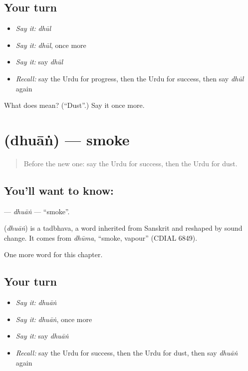 \subsection*{Your turn}
\begin{itemize}
\raggedright
  \item \emph{Say it:} \emph{dhūl}
  \item \emph{Say it:} \emph{dhūl}, once more
  \item \emph{Say it:} say \emph{dhūl}
  \item \emph{Recall:} say the Urdu for progress, then the Urdu for success, then say \emph{dhūl} again
\end{itemize}

\begin{tcolorbox}[breakable,colback=teal!4,colframe=teal!35!black,title={Before you move on}]
What does  mean? (\textquotedblleft{}Dust\textquotedblright{}.) Say it once more.
\end{tcolorbox}
\section[\texorpdfstring{\ur{دھواں} (dhuāṅ)}{دھواں (dhuāṅ)}]{ (dhuāṅ) — smoke}

\label{lesson:UR-C206-dhuan}



\begin{quote}
Before the new one: say the Urdu for success, then the Urdu for dust.
\end{quote}

\subsection*{You'll want to know: }
\textbf{} — \emph{dhuāṅ} — \textquotedblleft{}smoke\textquotedblright{}.

\begin{cousinweb}
\textbf{} (\emph{dhuāṅ}) is a tadbhava, a word inherited from Sanskrit and reshaped by sound change. It comes from \emph{dhūma}, \textquotedblleft{}smoke, vapour\textquotedblright{} (CDIAL 6849).
\end{cousinweb}

\begin{grammarlens}[title={What you've built}]
One more word for this chapter.
\end{grammarlens}

\subsection*{Your turn}
\begin{itemize}
\raggedright
  \item \emph{Say it:} \emph{dhuāṅ}
  \item \emph{Say it:} \emph{dhuāṅ}, once more
  \item \emph{Say it:} say \emph{dhuāṅ}
  \item \emph{Recall:} say the Urdu for success, then the Urdu for dust, then say \emph{dhuāṅ} again
\end{itemize}

